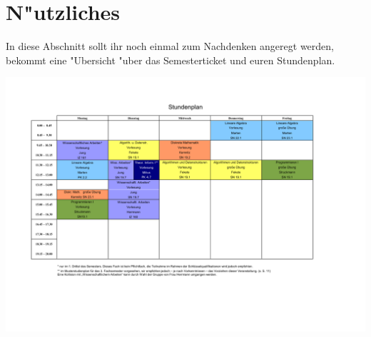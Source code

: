 \section{N"utzliches}

In diese Abschnitt sollt ihr noch einmal zum Nachdenken angeregt werden,
bekommt eine "Ubersicht "uber das Semesterticket und euren Stundenplan.
 


\includegraphics[angle=90,totalheight=\textheight, width=1.25\textwidth]
{texte/nuetzliches/stundenplan.pdf}
